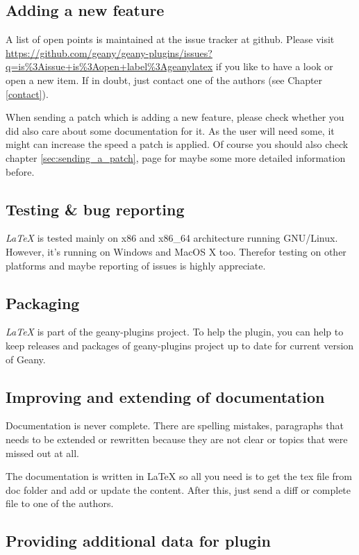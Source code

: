 \documentclass[%
paper=a4,%
fontsize=11pt,%
twoside=false,%
DIV18,%
headsepline,%
plainheadsepline,%
footsepline,%
plainfootsepline,%
bibliography=totoc,%
listof=totoc,%
BCOR10mm,%
parskip=half,%
openany,%
]{scrreprt}
\begin{document}
\subsection{Adding a new feature}

A list of open points is maintained at the issue tracker at github.
Please visit
\url{https://github.com/geany/geany-plugins/issues?q=is%3Aissue+is%3Aopen+label%3Ageanylatex}
if you like to have a look or open a new item. If in doubt, just
contact one of the authors (see Chapter \ref{contact}).

When sending a patch which is adding a new feature, please check
whether you did also care about some documentation for it. As the
user will need some, it might can increase the speed a patch is
applied. Of course you should also check chapter \ref{sec:sending_a_patch},
page \pageref{sec:sending_a_patch} for maybe some more detailed
information before.

\subsection{Testing \& bug reporting} \textit{LaTeX} is tested mainly
on x86 and x86\_64 architecture running GNU/Linux. However, it's
running on Windows and MacOS X too. Therefor testing on other platforms
and maybe reporting of issues is highly appreciate.

\subsection{Packaging}

\textit{LaTeX} is part of the geany-plugins project. To help the
plugin, you can help to keep releases and packages of geany-plugins
project up to date for current version of Geany.


\subsection{Improving and extending of documentation}
Documentation is never complete. There are spelling mistakes,
paragraphs that needs to be extended or rewritten because they are not
clear or topics that were missed out at all.

The documentation is written in \LaTeX{} so all you need is to get the
tex file from doc folder and add or update the content.
After this, just send a diff or complete file to one of the authors.


\subsection{Providing additional data for plugin}
\end{document}
